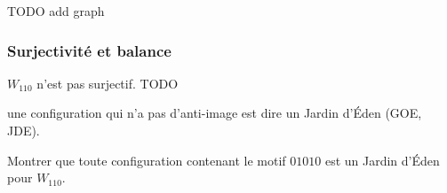 TODO add graph

\subsubsection{Surjectivité et balance}

\begin{exemple}
	$W_{110}$ n'est pas surjectif. TODO
\end{exemple}

\begin{definition}
	une configuration qui n'a pas d'anti-image est dire un Jardin d'Éden (GOE, JDE).
\end{definition}

\begin{exercice}
	Montrer que toute configuration contenant le motif $01010$ est un Jardin d'Éden pour $W_{110}$.
\end{exercice}
